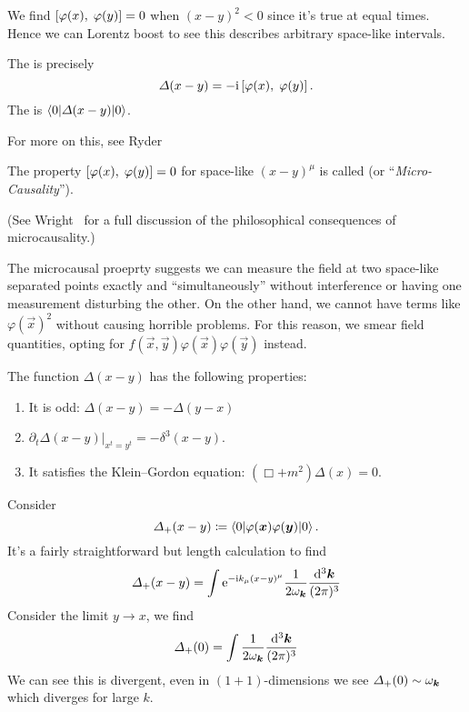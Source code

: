  We find $\left\lbrack\varphi(x),\;\varphi(y)\right\rbrack=0$ when
$(x-y)^{2}<0$ since it's true at equal times. Hence we can Lorentz boost
to see this describes arbitrary space-like intervals.

The 
is precisely 
\begin{equation}
\varDelta(x-y) = -\mathrm{i}\left\lbrack\varphi(x),\;\varphi(y)\right\rbrack.
\end{equation}
The 
is $\braket{0|\varDelta(x-y)|0}$.

\begin{remark}
For more on this, see Ryder~\cite[\S4.2 and \S6.1]{Ryder:1985wq}
\end{remark}

The property $\left\lbrack\varphi(x),\;\varphi(y)\right\rbrack=0$ for space-like
$(x-y)^{\mu}$ is called 
(or ``\emph{Micro-Causality\/}''). 

(See Wright~\cite{wright2012thesis} for a full discussion of the
philosophical consequences of microcausality.)

The microcausal proeprty suggests we can measure the field at two 
space-like separated points exactly and ``simultaneously'' without 
interference or having one measurement disturbing the other. On 
the other hand, we cannot have terms like $\varphi(\vec{x})^{2}$ 
without causing horrible problems. For this reason, we 
smear 
field quantities, opting for 
$f(\vec{x}, \vec{y})\varphi(\vec{x})\varphi(\vec{y})$ 
instead.

\begin{theorem}
The function $\Delta(x-y)$ has the following properties:
\begin{enumerate}
\item It is odd: $\Delta(x-y)=-\Delta(y-x)$
\item $\left.\partial_{t}\Delta(x-y)\right|_{x^{t}=y^{t}} = -\delta^{3}(x-y)$.
\item It satisfies the Klein--Gordon equation: $(\Box + m^{2})\Delta(x)=0$.
\end{enumerate}
\end{theorem}

\M
Consider
\begin{equation}
\Delta_{+}(x-y)\eqDef\braket{\vacuum|\varphi(\vec{x})\varphi(\vec{y})|\vacuum}.
\end{equation}
It's a fairly straightforward but length calculation to find
\begin{equation}
\Delta_{+}(x-y)=\int\E^{-\I
k_{\mu}(x-y)^{\mu}}\frac{1}{2\omega_{\vec{k}}}\frac{\D^{3}\vec{k}}{(2\pi)^{3}}
\end{equation}
Consider the limit $y\to x$, we find
\begin{equation}
\Delta_{+}(0)=\int
\frac{1}{2\omega_{\vec{k}}}\frac{\D^{3}\vec{k}}{(2\pi)^{3}}
\end{equation}
We can see this is divergent, even in $(1+1)$-dimensions we see
$\Delta_{+}(0)\looksLike\omega_{\vec{k}}$ which diverges for large $k$.

